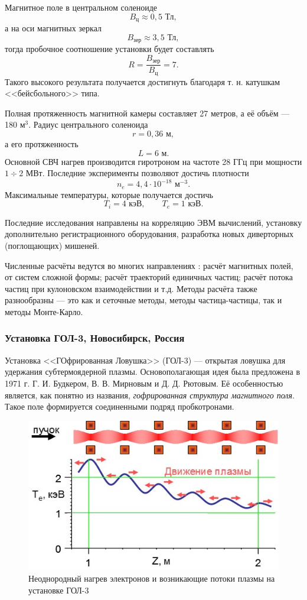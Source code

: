 Магнитное поле в центральном соленоиде 
\[
B_{\text{ц}} \approx 0,5 \text{ Тл},
\]
а на оси магнитных зеркал
\[
B_{\text{зер}} \approx 3,5 \text{ Тл},
\]
тогда пробочное соотношение установки будет составлять
\begin{equation}
R = \frac{B_{\text{зер}}}{B_{\text{ц}}} = 7.
\end{equation}
Такого высокого результата получается достигнуть благодаря т. н. катушкам <<бейсбольного>> типа.

Полная протяженность магнитной камеры составляет 27 метров, а её объём --- 180 м$^3$. Радиус центрального соленоида
\[
r = 0,36 \text{ м},
\]
а его протяженность 
\[
L = 6 \text{ м}.
\]
Основной СВЧ нагрев производится гиротроном на частоте 28 ГГц при мощности $1\div2$ МВт.
Последние эксперименты позволяют достичь плотности \cite{sumida2015high}
\[
n_e = 4,4 \cdot 10^{-18} \text{ м}^{-3}.
\] 
Максимальные температуры, которые получается достичь
\[
T_i = 4 \text{ кэВ}, \qquad T_e = 1 \text{ кэВ}.
\]

Последние исследования направлены на корреляцию ЭВМ вычислений, установку дополнительно регистрационного оборудования, разработка новых диверторных (поглощающих) мишеней\cite{imai2013gamma}.

Численные расчёты ведутся во многих направлениях \cite{gamma10_code}: расчёт магнитных полей, от систем сложной формы; расчёт траекторий единичных частиц; расчёт потока частиц при кулоновском взаимодействии и т.д. Методы расчёта также разнообразны --- это как и сеточные методы, методы частица-частицы, так и методы Монте-Карло.


\subsubsection{Установка ГОЛ-3, Новосибирск, Россия}

Установка <<ГОфрированная Ловушка>> (ГОЛ-3) --- открытая ловушка для удержания субтермоядерной плазмы. Основополагающая идея была предложена в 1971 г. Г. И. Будкером, В. В. Мирновым и Д. Д. Рютовым. Её особенностью является, как понятно из названия, \textit{гофрированная структура магнитного поля}. Такое поле формируется соединенными подряд пробкотронами.

\begin{figure}[h]
\centering
\includegraphics[width=0.7\linewidth]{./fig/ch1/GOL-3_02-03}
\caption{Неоднородный нагрев электронов и возникающие потоки плазмы на установке ГОЛ-3}
\label{fig:GOL-3_02-03}
\end{figure}


